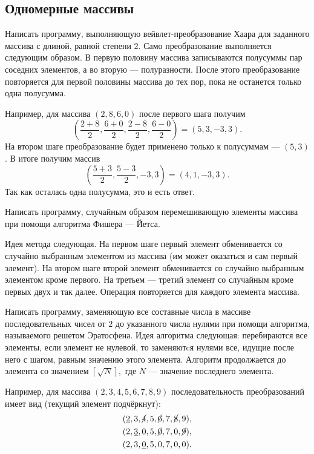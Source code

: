 
\subsection{Одномерные массивы}

\task Написать программу, выполняющую вейвлет-преобразование
Хаара для заданного массива с
длиной, равной степени $2$. Само преобразование выполняется следующим
образом. В первую половину массива записываются полусуммы пар соседних
элементов, а во вторую — полуразности. После этого преобразование
повторяется для первой половины массива до тех пор, пока не останется
только одна полусумма.

Например, для массива $(2, 8, 6, 0)$ после первого шага получим
\[
\left(\frac{2+8}2, \frac{6+0}2, \frac{2-8}2, \frac{6-0}2\right) = (5, 3, -3, 3).
\]
На втором шаге преобразование будет применено только к полусуммам —
$(5, 3)$. В итоге получим массив
\[
\left(\frac{5+3}2, \frac{5-3}2, -3, 3\right) = (4, 1, -3, 3).
\]
Так как осталась одна полусумма, это и есть ответ.

\task Написать программу, случайным образом перемешивающую элементы
массива при помощи алгоритма Фишера — Йетса.

Идея метода следующая. На первом шаге первый элемент обменивается со
случайно выбранным элементом из массива (им может оказаться и сам
первый элемент). На втором шаге второй элемент обменивается со
случайно выбранным элементом кроме первого. На третьем — третий
элемент со случайным кроме первых двух и так далее. Операция
повторяется для каждого элемента массива.

\task Написать программу, заменяющую все составные числа в массиве
последовательных чисел от $2$ до указанного числа нулями при помощи
алгоритма, называемого решетом Эратосфена.
Идея алгоритма следующая: перебираются все элементы, если элемент не
нулевой, то заменяютcя нулями все, идущие после него с шагом, равным
значению этого элемента. Алгоритм продолжается до элемента со
значением $\left\lceil\sqrt N\right\rceil,$ где $N$ — значение
последнего элемента.

Например, для массива $(2, 3, 4, 5, 6, 7, 8, 9)$ последовательность
преобразований имеет вид (текущий элемент подчёркнут):
\begin{eqnarray*}
&(\underline2, 3, \cancel4, 5, \cancel6, 7, \cancel8, 9),\\
&(2, \underline3, 0, 5, \cancel0, 7, 0, \cancel9),\\
&(2, 3, \underline0, 5, 0, 7, 0, 0).
\end{eqnarray*}

